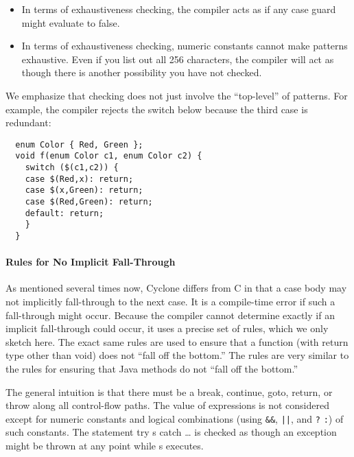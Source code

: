 \begin{itemize}
\item In terms of exhaustiveness checking, the compiler acts as if any
  case guard might evaluate to false.
\item In terms of exhaustiveness checking, numeric constants cannot
  make patterns exhaustive.  Even if you list out all 256 characters,
  the compiler will act as though there is another possibility you
  have not checked.
\end{itemize}

We emphasize that checking does not just involve the ``top-level'' of
patterns.  For example, the compiler rejects the switch below because
the third case is redundant:

\begin{verbatim}
  enum Color { Red, Green };
  void f(enum Color c1, enum Color c2) {
    switch ($(c1,c2)) {
    case $(Red,x): return;
    case $(x,Green): return;
    case $(Red,Green): return;
    default: return;
    }
  }
\end{verbatim}

\paragraph{Rules for No Implicit Fall-Through}

As mentioned several times now, Cyclone differs from C in that a case
body may not implicitly fall-through to the next case.  It is a
compile-time error if such a fall-through might occur.  Because the
compiler cannot determine exactly if an implicit fall-through could
occur, it uses a precise set of rules, which we only sketch here.  The
exact same rules are used to ensure that a function (with return type
other than void) does not ``fall off the bottom.''  The rules
are very similar to the rules for ensuring that Java methods do not
``fall off the bottom.''

The general intuition is that there must be a break, continue, goto,
return, or throw along all control-flow paths.  The value of
expressions is not considered except for numeric constants and logical
combinations (using \texttt{\&\&}, \texttt{||}, and \texttt{?} \texttt{:}) of
such constants.  The statement try s catch \ldots{} is checked as
though an exception might be thrown at any point while s executes.

